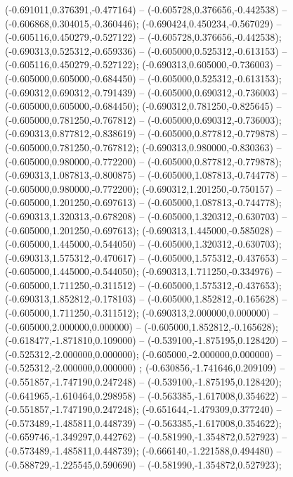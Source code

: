  (-0.691011,0.376391,-0.477164) -- (-0.605728,0.376656,-0.442538) -- (-0.606868,0.304015,-0.360446);
 (-0.690424,0.450234,-0.567029) -- (-0.605116,0.450279,-0.527122) -- (-0.605728,0.376656,-0.442538);
 (-0.690313,0.525312,-0.659336) -- (-0.605000,0.525312,-0.613153) -- (-0.605116,0.450279,-0.527122);
 (-0.690313,0.605000,-0.736003) -- (-0.605000,0.605000,-0.684450) -- (-0.605000,0.525312,-0.613153);
 (-0.690312,0.690312,-0.791439) -- (-0.605000,0.690312,-0.736003) -- (-0.605000,0.605000,-0.684450);
 (-0.690312,0.781250,-0.825645) -- (-0.605000,0.781250,-0.767812) -- (-0.605000,0.690312,-0.736003);
 (-0.690313,0.877812,-0.838619) -- (-0.605000,0.877812,-0.779878) -- (-0.605000,0.781250,-0.767812);
 (-0.690313,0.980000,-0.830363) -- (-0.605000,0.980000,-0.772200) -- (-0.605000,0.877812,-0.779878);
 (-0.690313,1.087813,-0.800875) -- (-0.605000,1.087813,-0.744778) -- (-0.605000,0.980000,-0.772200);
 (-0.690312,1.201250,-0.750157) -- (-0.605000,1.201250,-0.697613) -- (-0.605000,1.087813,-0.744778);
 (-0.690313,1.320313,-0.678208) -- (-0.605000,1.320312,-0.630703) -- (-0.605000,1.201250,-0.697613);
 (-0.690313,1.445000,-0.585028) -- (-0.605000,1.445000,-0.544050) -- (-0.605000,1.320312,-0.630703);
 (-0.690313,1.575312,-0.470617) -- (-0.605000,1.575312,-0.437653) -- (-0.605000,1.445000,-0.544050);
 (-0.690313,1.711250,-0.334976) -- (-0.605000,1.711250,-0.311512) -- (-0.605000,1.575312,-0.437653);
 (-0.690313,1.852812,-0.178103) -- (-0.605000,1.852812,-0.165628) -- (-0.605000,1.711250,-0.311512);
 (-0.690313,2.000000,0.000000) -- (-0.605000,2.000000,0.000000) -- (-0.605000,1.852812,-0.165628);
 (-0.618477,-1.871810,0.109000) -- (-0.539100,-1.875195,0.128420) -- (-0.525312,-2.000000,0.000000);
 (-0.605000,-2.000000,0.000000) -- (-0.525312,-2.000000,0.000000) ;
 (-0.630856,-1.741646,0.209109) -- (-0.551857,-1.747190,0.247248) -- (-0.539100,-1.875195,0.128420);
 (-0.641965,-1.610464,0.298958) -- (-0.563385,-1.617008,0.354622) -- (-0.551857,-1.747190,0.247248);
 (-0.651644,-1.479309,0.377240) -- (-0.573489,-1.485811,0.448739) -- (-0.563385,-1.617008,0.354622);
 (-0.659746,-1.349297,0.442762) -- (-0.581990,-1.354872,0.527923) -- (-0.573489,-1.485811,0.448739);
 (-0.666140,-1.221588,0.494480) -- (-0.588729,-1.225545,0.590690) -- (-0.581990,-1.354872,0.527923);
